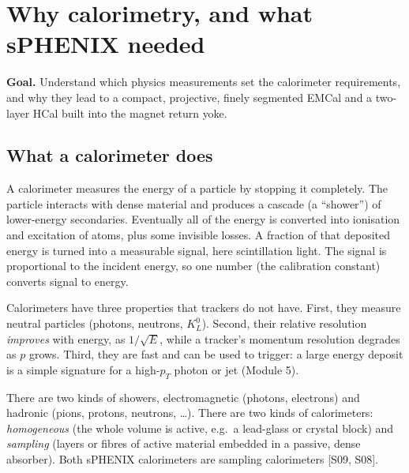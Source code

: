\documentclass[11pt,letterpaper]{article}
\newcommand{\goal}[1]{\par\noindent\textbf{Goal.} #1\par\smallskip}
\begin{document}
\section{Why calorimetry, and what sPHENIX needed}\label{sec:req}
\goal{Understand which physics measurements set the calorimeter requirements, and why they lead to a compact, projective, finely segmented EMCal and a two-layer HCal built into the magnet return yoke.}

\subsection{What a calorimeter does}
A calorimeter measures the energy of a particle by stopping it completely.
The particle interacts with dense material and produces a cascade (a ``shower'') of lower-energy secondaries.
Eventually all of the energy is converted into ionisation and excitation of atoms, plus some invisible losses.
A fraction of that deposited energy is turned into a measurable signal, here scintillation light.
The signal is proportional to the incident energy, so one number (the calibration constant) converts signal to energy.

Calorimeters have three properties that trackers do not have.
First, they measure neutral particles (photons, neutrons, $K^0_L$).
Second, their relative resolution \emph{improves} with energy, as $1/\sqrt{E}$, while a tracker's momentum resolution degrades as $p$ grows.
Third, they are fast and can be used to trigger: a large energy deposit is a simple signature for a high-$p_T$ photon or jet (Module 5).

There are two kinds of showers, electromagnetic (photons, electrons) and hadronic (pions, protons, neutrons, \dots).
There are two kinds of calorimeters: \emph{homogeneous} (the whole volume is active, e.g.\ a lead-glass or crystal block) and \emph{sampling} (layers or fibres of active material embedded in a passive, dense absorber).
Both sPHENIX calorimeters are sampling calorimeters [S09, S08].
\end{document}
